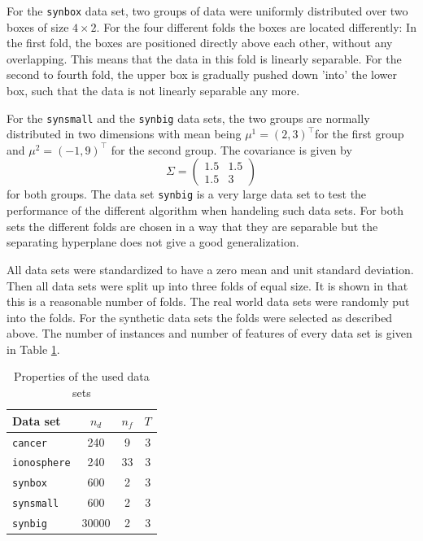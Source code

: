 For the \texttt{synbox} data set, two groups of data were uniformly distributed over two boxes of size \(4\times2\). For the four different folds the boxes are located differently: In the first fold, the boxes are positioned directly above each other, without any overlapping. This means that the data in this fold is linearly separable.
For the second to fourth fold, the upper box  is gradually pushed down 'into' the lower box, such that the data is not linearly separable any more.

For the \texttt{synsmall} and the \texttt{synbig} data sets,  the two groups are normally distributed in two dimensions with mean being \(\mu^1 = (2,3)^{\top}\)for the first group and \(\mu^2 = (-1,9)^{\top}\) for the second group. The covariance is given by
 \[\Sigma = \begin{pmatrix}1.5 & 1.5\\1.5 & 3\end{pmatrix}\] for both groups. 
The data set \texttt{synbig} is a very large data set to test the performance of the different algorithm when handeling such data sets.
For both sets the different folds are chosen in a way that they are separable but the separating hyperplane does not give a good generalization.

All data sets were standardized to have a zero mean and unit standard deviation. Then all data sets were split up into three folds of equal size. It is shown in \cite[p. 47]{Kunapuli2008} that this is a reasonable number of folds.
The real world data sets were randomly put into the folds. For the synthetic data sets the folds were selected as described above. The number of instances and number of features of every data set is given in Table \ref{tab_set_props}. 

\begin{center}
\begin{table}[H]%
	\begin{tabular}{lccc}
		\hline
    Data set & \(n_d\) &  \(n_f\) & \(T\) \\
		\hline
		\texttt{cancer} & 240 & 9 & 3 \\
		\texttt{ionosphere} & 240 & 33 & 3 \\
		\texttt{synbox} & 600 & 2 & 3 \\
		\texttt{synsmall} & 600 & 2 & 3 \\
		\texttt{synbig} & 30000 & 2 & 3
	\end{tabular}
	\caption[Properties of data sets]{Properties of the used data sets}
	\label{tab_set_props}
\end{table}
\end{center}

